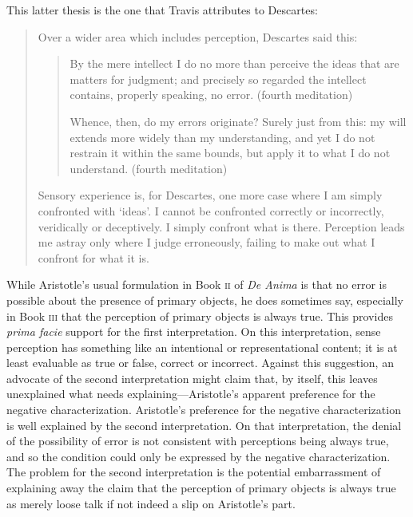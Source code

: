 This latter thesis is the one that Travis attributes to Descartes:
\begin{quotation}
	\noindent Over a wider area which includes perception, Descartes said this:
	\begin{quote}
		By the mere intellect I do no more than perceive the ideas that are matters for judgment; and precisely so regarded the intellect contains, properly speaking, no error. (fourth meditation)
		
		Whence, then, do my errors originate? Surely just from this: my will extends more widely than my understanding, and yet I do not restrain it within the same bounds, but apply it to what I do not understand. (fourth meditation)
	\end{quote}
	Sensory experience is, for Descartes, one more case where I am simply confronted with `ideas'. I cannot be confronted correctly or incorrectly, veridically or deceptively. I simply confront what is there. Perception leads me astray only where I judge erroneously, failing to make out what I confront for what it is. \citep[64--65]{Travis:2004kx}
\end{quotation}

While Aristotle's usual formulation in Book \textsc{ii} of \emph{De Anima} is that no error is possible about the presence of primary objects, he does sometimes say, especially in Book \textsc{iii} that the perception of primary objects is always true. This provides \emph{prima facie} support for the first interpretation. On this interpretation, sense perception has something like an intentional or representational content; it is at least evaluable as true or false, correct or incorrect. Against this suggestion, an advocate of the second interpretation might claim that, by itself, this leaves unexplained what needs explaining---\-Aristotle's apparent preference for the negative characterization. Aristotle's preference for the negative characterization is well explained by the second interpretation. On that interpretation, the denial of the possibility of error is not consistent with perceptions being always true, and so the condition could only be expressed by the negative characterization. The problem for the second interpretation is the potential embarrassment of explaining away the claim that the perception of primary objects is always true as merely loose talk if not indeed a slip on Aristotle's part.

